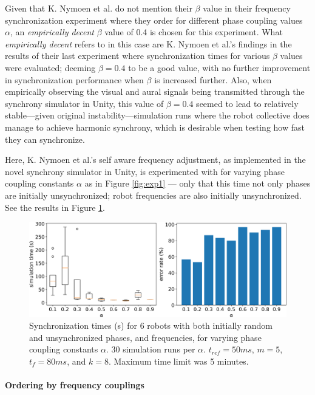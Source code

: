 		Given that K. Nymoen et al. do not mention their $\beta$ value in their frequency synchronization experiment where they order for different phase coupling values $\alpha$, an \textit{empirically decent} $\beta$ value of 0.4 is chosen for this experiment. What \textit{empirically decent} refers to in this case are K. Nymoen et al.'s findings in the results of their last experiment \cite{nymoen_synch} where synchronization times for various $\beta$ values were evaluated; deeming $\beta=0.4$ to be a good value, with no further improvement in synchronization performance when $\beta$ is increased further. Also, when empirically observing the visual and aural signals being transmitted through the synchrony simulator in Unity, this value of $\beta=0.4$ seemed to lead to relatively stable—given original instability—simulation runs where the robot collective does manage to achieve harmonic synchrony, which is desirable when testing how fast they can synchronize.
		
		Here, K. Nymoen et al.'s self aware frequency adjustment, as implemented in the novel synchrony simulator in Unity, is experimented with for varying phase coupling constants $\alpha$ as in Figure \ref{fig:exp1} — only that this time not only phases are initially unsynchronized; robot frequencies are also initially unsynchronized. See the results in Figure \ref{fig:exp2}.
		
		\begin{figure}[ht!]
			\centering
			\includegraphics[width=\linewidth]{Assets/DocSegments/Chapters/ExperimentsAndResults/Figures/PerfScores/experiment2_perfScores.pdf}
			\caption{Synchronization times (s) for 6 robots with both initially random and unsynchronized phases, and frequencies, for varying phase coupling constants $\alpha$. 30 simulation runs per $\alpha$. $t_{ref}=50ms$, $m=5$, $t_f=80ms$, and $k=8$. Maximum time limit was 5 minutes.}
			\label{fig:exp2}
		\end{figure}
	
	
		\paragraph{Ordering by frequency couplings}
		

